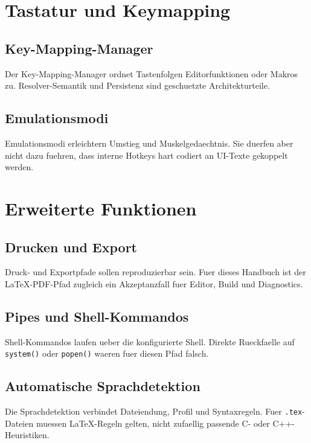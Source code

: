 \documentclass[a4paper,11pt]{report}
\begin{document}
\chapter{Tastatur und Keymapping}

\section{Key-Mapping-Manager}

Der Key-Mapping-Manager ordnet Tastenfolgen Editorfunktionen oder Makros zu.
Resolver-Semantik und Persistenz sind geschuetzte Architekturteile.

\section{Emulationsmodi}

Emulationsmodi erleichtern Umstieg und Muskelgedaechtnis. Sie duerfen aber
nicht dazu fuehren, dass interne Hotkeys hart codiert an UI-Texte gekoppelt
werden.

\chapter{Erweiterte Funktionen}

\section{Drucken und Export}

Druck- und Exportpfade sollen reproduzierbar sein. Fuer dieses Handbuch ist der
LaTeX-PDF-Pfad zugleich ein Akzeptanzfall fuer Editor, Build und Diagnostics.

\section{Pipes und Shell-Kommandos}

Shell-Kommandos laufen ueber die konfigurierte Shell. Direkte Rueckfaelle auf
\texttt{system()} oder \texttt{popen()} waeren fuer diesen Pfad falsch.

\section{Automatische Sprachdetektion}

Die Sprachdetektion verbindet Dateiendung, Profil und Syntaxregeln. Fuer
\texttt{.tex}-Dateien muessen LaTeX-Regeln gelten, nicht zufaellig passende
C- oder C++-Heuristiken.
\end{document}
